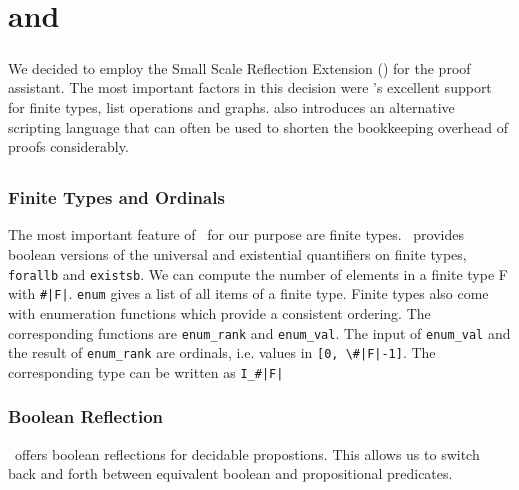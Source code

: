 \chapter{\coq and \ssreflect}

\paragraph{}
We decided to employ the Small Scale Reflection Extension (\textbf{\ssreflect}) for the \textbf{\coq} proof assistant. 
The most important factors in this decision were \ssreflect's excellent support for finite types, list operations and graphs. \ssreflect{} also introduces an alternative scripting language that can often be used to shorten the bookkeeping overhead of proofs considerably.

\section{\coq}

\section{\ssreflect}

\subsection{Finite Types and Ordinals}
The most important feature of \ssreflect\ for our purpose are finite types. 
\ssreflect\ provides boolean versions of the universal and existential quantifiers on finite types, \lstinline{forallb} and \lstinline{existsb}.
We can compute the number of elements in a finite type F with \lstinline{#|F|}.
\lstinline{enum} gives a list of all items of a finite type. 
Finite types also come with enumeration functions which provide a consistent ordering. 
The corresponding functions are \lstinline{enum_rank} and \lstinline{enum_val}. 
The input of \lstinline{enum_val} and the result of \lstinline{enum_rank} are ordinals, i.e. values in \lstinline{[0, \#|F|-1]}. 
The corresponding type can be written as \lstinline{I_#|F|}

\subsection{Boolean Reflection}
\ssreflect\ offers boolean reflections for decidable propostions. 
This allows us to switch back and forth between equivalent boolean and propositional predicates.

